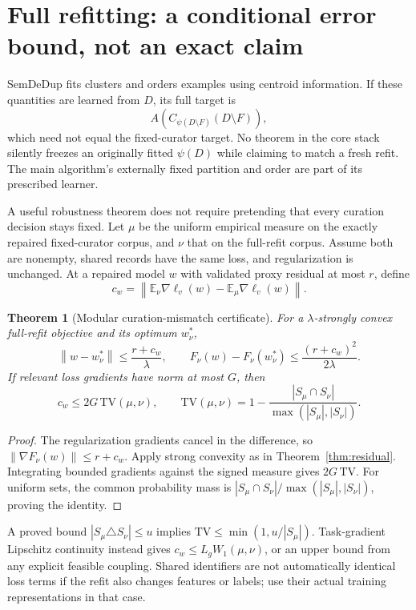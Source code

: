 \documentclass[11pt,a4paper]{article}
\newtheorem{theorem}{Theorem}[section]
\theoremstyle{definition}\newtheorem{definition}[theorem]{Definition}
\newcommand{\norm}[1]{\left\lVert #1\right\rVert}
\newcommand{\minus}{\setminus}
\begin{document}
\section{Full refitting: a conditional error bound, not an exact claim}\label{sec:refit}
SemDeDup fits clusters and orders examples using centroid information. If these quantities are learned from $D$, its full target is
\[
 A\!\left(C_{\psi(D\minus F)}(D\minus F)\right),
\]
which need not equal the fixed-curator target. No theorem in the core stack silently freezes an originally fitted $\psi(D)$ while claiming to match a fresh refit. The main algorithm's externally fixed partition and order are part of its prescribed learner.

A useful robustness theorem does not require pretending that every curation decision stays fixed. Let $\mu$ be the uniform empirical measure on the exactly repaired fixed-curator corpus, and $\nu$ that on the full-refit corpus. Assume both are nonempty, shared records have the same loss, and regularization is unchanged. At a repaired model $w$ with validated proxy residual at most $r$, define
\[
 c_w=\norm{\mathbb E_\nu\nabla\ell_v(w)-\mathbb E_\mu\nabla\ell_v(w)}.
\]
\begin{theorem}[Modular curation-mismatch certificate]\label{thm:mismatch}
For a $\lambda$-strongly convex full-refit objective and its optimum $w_\nu^*$,
\[
 \norm{w-w_\nu^*}\le\frac{r+c_w}{\lambda},\qquad
 F_\nu(w)-F_\nu(w_\nu^*)\le\frac{(r+c_w)^2}{2\lambda}.
\]
If relevant loss gradients have norm at most $G$, then
\[
 c_w\le2G\,\mathrm{TV}(\mu,\nu),\qquad
 \mathrm{TV}(\mu,\nu)=1-\frac{|S_\mu\cap S_\nu|}{\max(|S_\mu|,|S_\nu|)}.
\]
\end{theorem}
\begin{proof}
The regularization gradients cancel in the difference, so $\norm{\nabla F_\nu(w)}\le r+c_w$. Apply strong convexity as in Theorem~\ref{thm:residual}. Integrating bounded gradients against the signed measure gives $2G\,\mathrm{TV}$. For uniform sets, the common probability mass is $|S_\mu\cap S_\nu|/\max(|S_\mu|,|S_\nu|)$, proving the identity.
\end{proof}
A proved bound $|S_\mu\triangle S_\nu|\le u$ implies $\mathrm{TV}\le\min(1,u/|S_\mu|)$. Task-gradient Lipschitz continuity instead gives $c_w\le L_gW_1(\mu,\nu)$, or an upper bound from any explicit feasible coupling. Shared identifiers are not automatically identical loss terms if the refit also changes features or labels; use their actual training representations in that case.
\end{document}
